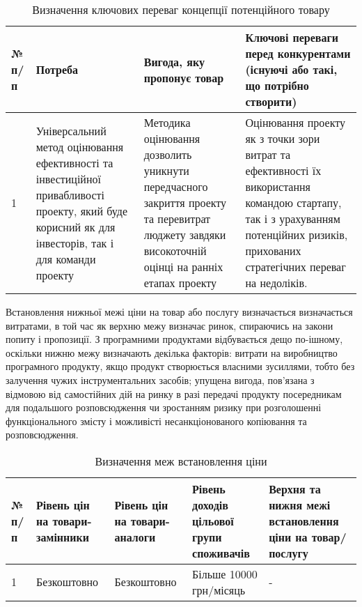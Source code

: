 \begin{table}[H]
\fontsize{12pt}{12pt}\selectfont
	\begin{tabularx}{\textwidth}{|l|X|X|X|}
    \hline
    № п/п & Потреба & Вигода, яку пропонує товар & Ключові переваги перед конкурентами (існуючі або такі, що потрібно створити) \\ \hline
    1 & Універсальний метод оцінювання ефективності та інвестиційної привабливості проекту, який буде корисний як для інвесторів, так і для команди проекту & Методика оцінювання дозволить уникнути передчасного закриття проекту та перевитрат люджету завдяки високоточній оцінці на ранніх етапах проекту & Оцінювання проекту як з точки зори витрат та ефективності їх використання командою стартапу, так і з урахуванням потенційних ризиків, прихованих стратегічних переваг на недоліків. \\
    \hline
    \end{tabularx}
\caption{Визначення ключових переваг концепції потенційного товару} \label{tab:stab_14}
\end{table}

Встановлення нижньої межі ціни на товар або послугу визначається визначається витратами, в той час як верхню межу визначає ринок, спираючись на закони попиту і пропозиції. З програмними продуктами відбувається дещо по-ішному, оскільки нижню межу визначають декілька факторів: витрати на виробництво програмного продукту, якщо продукт створюється власними зусиллями, тобто без залучення чужих інструментальних засобів; упущена вигода, пов'язана з відмовою від самостійних дій на ринку в разі передачі продукту посередникам для подальшого розповсюдження чи зростанням ризику при розголошенні функціонального змісту і можливісті несанкціонованого копіювання та розповсюдження.

\begin{table}[H]
\fontsize{12pt}{12pt}\selectfont
	\begin{tabularx}{\textwidth}{|l|X|X|X|X|}
    \hline
    № п/п & Рівень цін на товари-замінники & Рівень цін на товари-аналоги & Рівень доходів цільової групи споживачів & Верхня та нижня межі встановлення ціни на товар/послугу \\ \hline
    1 & Безкоштовно & Безкоштовно & Більше 10000 грн/місяць & - \\
    \hline
    \end{tabularx}
\caption{Визначення меж встановлення ціни} \label{tab:stab_15}
\end{table}

